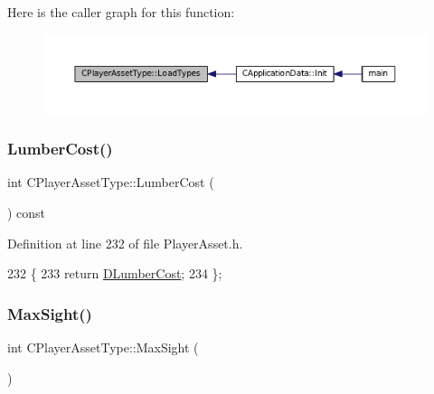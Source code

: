 Here is the caller graph for this function\+:\nopagebreak
\begin{figure}[H]
\begin{center}
\leavevmode
\includegraphics[width=350pt]{classCPlayerAssetType_ad36348338ae4fea7e70450ef30c92a26_icgraph}
\end{center}
\end{figure}
\hypertarget{classCPlayerAssetType_a0263936149918ed7fe3844bcd0e15d72}{}\label{classCPlayerAssetType_a0263936149918ed7fe3844bcd0e15d72} 
\subsubsection{\texorpdfstring{Lumber\+Cost()}{LumberCost()}}
{\footnotesize\ttfamily int C\+Player\+Asset\+Type\+::\+Lumber\+Cost (\begin{DoxyParamCaption}{ }\end{DoxyParamCaption}) const\hspace{0.3cm}{\ttfamily [inline]}}



Definition at line 232 of file Player\+Asset.\+h.


\begin{DoxyCode}
232                               \{
233             \textcolor{keywordflow}{return} \hyperlink{classCPlayerAssetType_aab2aeb930d654fd5eab51be157b3439f}{DLumberCost};  
234         \};
\end{DoxyCode}
\hypertarget{classCPlayerAssetType_a1c1648ef0fdd2d112508c2ef9b7b70d1}{}\label{classCPlayerAssetType_a1c1648ef0fdd2d112508c2ef9b7b70d1} 
\subsubsection{\texorpdfstring{Max\+Sight()}{MaxSight()}}
{\footnotesize\ttfamily int C\+Player\+Asset\+Type\+::\+Max\+Sight (\begin{DoxyParamCaption}{ }\end{DoxyParamCaption})\hspace{0.3cm}{\ttfamily [static]}}



